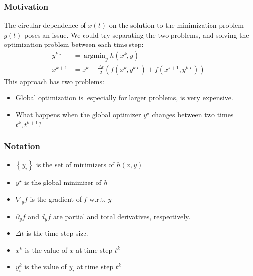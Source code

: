 \documentclass[10pt]{beamer}
\DeclareMathOperator*{\argmin}{\arg\min}
\begin{document}
\begin{frame}
	\frametitle{Motivation}
	The circular dependence of $x(t)$ on the solution to the minimization problem $y(t)$ poses an issue. We could try separating the two problems, and solving the optimization problem between each time step:
	\vfill
	\begin{equation}
		\begin{aligned}
			\label{eq:bad-time-stepping}
			y^{k\star} &= \argmin_y h(x^k, y)\\
			x^{k+1} &= x^{k} + \frac{\Delta t}{2}\left(f(x^k, y^{k\star}) + f(x^{k+1}, y^{k\star})\right)
		\end{aligned}
	\end{equation}
	\vfill
	This approach has two problems:
	\begin{itemize}
		\item Global optimization is, especially for larger problems, is very expensive.
		\item What happens when the global optimizer $y^\star$ changes between two times $t^{k}, t^{k+1}$?
	\end{itemize}
\end{frame}

\begin{frame}
	\frametitle{Notation}
	\begin{minipage}{0.45\columnwidth}
		\begin{itemize}
			\item $\left\{y_i\right\}$ is the set of minimizers of $h(x, y)$
			\item $y^\star$ is the global minimizer of $h$
			\item $\nabla_y f$ is the gradient of $f$ w.r.t. $y$
			\item $\partial_y f$ and $d_y f$ are partial and total derivatives, respectively. 
		\end{itemize}
	\end{minipage}
	\hfill
	\begin{minipage}{0.45\columnwidth}
		\begin{itemize}
			\item $\Delta t$ is the time step size.
			\item $x^k$ is the value of $x$ at time step $t^k$
			\item $y^k_i$ is the value of $y_i$ at time step $t^k$
		\end{itemize}
	\end{minipage}
\end{frame}
\end{document}
